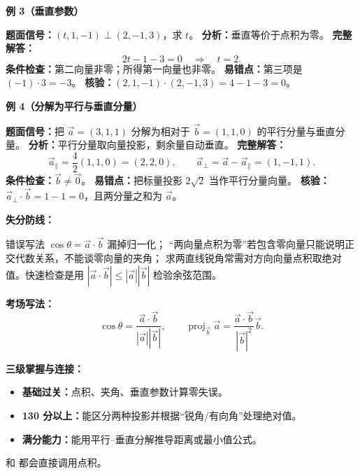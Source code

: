\begin{knowledgeBox}
\textbf{例 3（垂直参数）}

\textbf{题面信号：}\((t,1,-1)\perp(2,-1,3)\)，求 \(t\)。
\textbf{分析：}垂直等价于点积为零。
\textbf{完整解答：}
\[
2t-1-3=0\quad\Longrightarrow\quad t=2.
\]
\textbf{条件检查：}第二向量非零；所得第一向量也非零。
\textbf{易错点：}第三项是 \((-1)\cdot3=-3\)。
\textbf{核验：}\((2,1,-1)\cdot(2,-1,3)=4-1-3=0\)。

\textbf{例 4（分解为平行与垂直分量）}

\textbf{题面信号：}把 \(\vec a=(3,1,1)\) 分解为相对于
\(\vec b=(1,1,0)\) 的平行分量与垂直分量。
\textbf{分析：}平行分量取向量投影，剩余量自动垂直。
\textbf{完整解答：}
\[
\vec a_{\parallel}
=\frac{4}{2}(1,1,0)=(2,2,0),\qquad
\vec a_{\perp}=\vec a-\vec a_{\parallel}=(1,-1,1).
\]
\textbf{条件检查：}\(\vec b\ne\vec0\)。
\textbf{易错点：}把标量投影 \(2\sqrt2\) 当作平行分量向量。
\textbf{核验：}\(\vec a_{\perp}\cdot\vec b=1-1=0\)，且两分量之和为
\(\vec a\)。

\textbf{失分防线：}

错误写法 \(\cos\theta=\vec a\cdot\vec b\) 漏掉归一化；
“两向量点积为零”若包含零向量只能说明正交代数关系，不能谈零向量的夹角；
求两直线锐角常需对方向向量点积取绝对值。快速检查是用
\(|\vec a\cdot\vec b|\le|\vec a||\vec b|\) 检验余弦范围。

\textbf{考场写法：}
\[
\boxed{\cos\theta=\frac{\vec a\cdot\vec b}{|\vec a||\vec b|},\qquad
\operatorname{proj}_{\vec b}\vec a
=\frac{\vec a\cdot\vec b}{|\vec b|^2}\vec b.}
\]

\textbf{三级掌握与连接：}
\begin{itemize}
  \item \textbf{基础过关：}点积、夹角、垂直参数计算零失误。
  \item \textbf{130 分以上：}能区分两种投影并根据“锐角/有向角”处理绝对值。
  \item \textbf{满分能力：}能用平行--垂直分解推导距离或最小值公式。
\end{itemize}
和
都会直接调用点积。
\end{knowledgeBox}


\par

